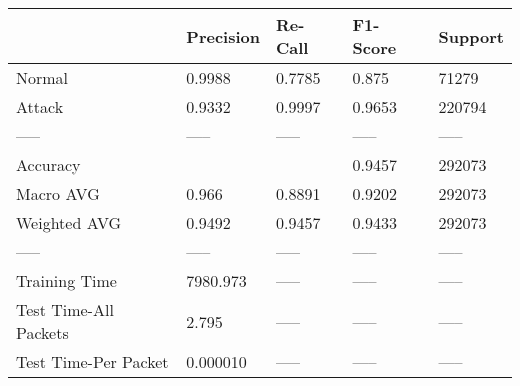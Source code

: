 \begin{tabular}{lllll}
\toprule
{} & Precision & Re-Call & F1-Score & Support \\
\midrule
Normal                &    0.9988 &  0.7785 &    0.875 &   71279 \\
Attack                &    0.9332 &  0.9997 &   0.9653 &  220794 \\
-----                 &     ----- &   ----- &    ----- &   ----- \\
Accuracy              &           &         &   0.9457 &  292073 \\
Macro AVG             &     0.966 &  0.8891 &   0.9202 &  292073 \\
Weighted AVG          &    0.9492 &  0.9457 &   0.9433 &  292073 \\
-----                 &     ----- &   ----- &    ----- &   ----- \\
Training Time         &  7980.973 &   ----- &    ----- &   ----- \\
Test Time-All Packets &     2.795 &   ----- &    ----- &   ----- \\
Test Time-Per Packet  &  0.000010 &   ----- &    ----- &   ----- \\
\bottomrule
\end{tabular}
